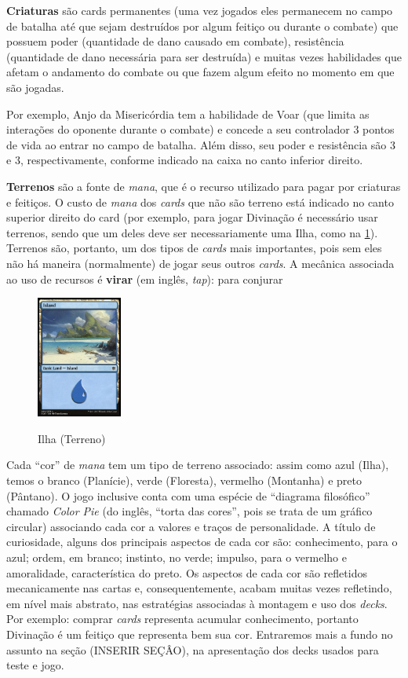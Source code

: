 \documentclass{book}
\begin{document}
\textbf{Criaturas} são cards permanentes (uma vez jogados eles
permanecem no campo de batalha até que sejam destruídos por algum
feitiço ou durante o combate) que possuem poder (quantidade de dano
causado em combate), resistência (quantidade de dano necessária para ser
destruída) e muitas vezes habilidades que afetam o andamento do combate
ou que fazem algum efeito no momento em que são jogadas.

Por exemplo, Anjo da Misericórdia tem a habilidade de Voar (que limita
as interações do oponente durante o combate) e concede a seu controlador
3 pontos de vida ao entrar no campo de batalha. Além disso, seu poder e
resistência são 3 e 3, respectivamente, conforme indicado na caixa no
canto inferior direito.

\textbf{Terrenos} são a fonte de \textit{mana}, que é o recurso
utilizado para pagar por criaturas e feitiços. O custo de \textit{mana}
dos \textit{cards} que não são terreno está indicado no canto superior
direito do card (por exemplo, para jogar Divinação é necessário usar
terrenos, sendo que um deles deve ser necessariamente uma Ilha, como na
\ref{ilha}). Terrenos são, portanto, um dos tipos de \textit{cards}
mais importantes, pois sem eles não há maneira (normalmente) de jogar
seus outros \textit{cards}. A mecânica associada ao uso de recursos é
\textbf{virar} (em inglês, \textit{tap}): para conjurar

\begin{figure}
    \centering
    \includegraphics[width=0.25\textwidth]{picstcc/island.jpg}
    \label{ilha}
    \caption{Ilha (Terreno)}
\end{figure}

Cada ``cor'' de \textit{mana} tem um tipo de terreno associado: assim
como azul (Ilha), temos o branco (Planície), verde (Floresta),
vermelho (Montanha) e preto (Pântano). O jogo inclusive conta com uma
espécie de ``diagrama filosófico'' chamado \textit{Color Pie}
(do inglês, ``torta das cores'', pois se trata de um gráfico circular)
associando cada cor a valores e traços de personalidade.
A título de curiosidade, alguns dos principais aspectos de cada cor são:
conhecimento, para o azul; ordem, em branco; instinto, no verde;
impulso, para o vermelho e amoralidade, característica do preto. Os
aspectos de cada cor são refletidos mecanicamente nas cartas e,
consequentemente, acabam muitas vezes refletindo, em nível mais
abstrato, nas estratégias associadas à montagem e uso dos
\textit{decks}.
Por exemplo: comprar \textit{cards} representa acumular conhecimento,
portanto Divinação é um feitiço que representa bem sua cor.
Entraremos mais a fundo no assunto na seção (INSERIR SEÇÂO), na
apresentação dos decks usados para teste e jogo.
\end{document}
